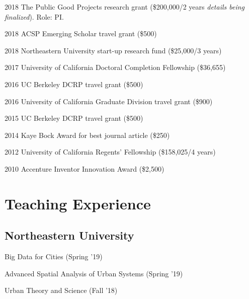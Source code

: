 \documentclass[12pt,letterpaper]{report}
\newcommand{\listitemspace}{0.15em}
\renewenvironment{itemize}
{\begin{list}{}{\setlength{\leftmargin}{0em}
				\setlength{\parskip}{0em}
				\setlength{\itemsep}{\listitemspace}
				\setlength{\parsep}{\listitemspace}}}
{\end{list}}
\begin{document}
\begin{tablist}

\item[2018] \tab The Public Good Projects research grant (\$200,000/2 years \textit{details being finalized}). Role: PI.

\item[2018] \tab ACSP Emerging Scholar travel grant (\$500)

\item[2018] \tab Northeastern University start-up research fund (\$25,000/3 years)

\item[2017] \tab University of California Doctoral Completion Fellowship (\$36,655)

\item[2016] \tab UC Berkeley DCRP travel grant (\$500)

\item[2016] \tab University of California Graduate Division travel grant (\$900)

\item[2015] \tab UC Berkeley DCRP travel grant (\$500)

\item[2014] \tab Kaye Bock Award for best journal article (\$250)

\item[2012] \tab University of California Regents' Fellowship (\$158,025/4 years)

\item[2010] \tab Accenture Inventor Innovation Award (\$2,500)

\end{tablist}



\section*{Teaching Experience}

\subsection*{Northeastern University}
	
\begin{itemize}

\item Big Data for Cities (Spring '19)

\item Advanced Spatial Analysis of Urban Systems (Spring '19)

\item Urban Theory and Science (Fall '18)

\end{itemize}
\end{document}
